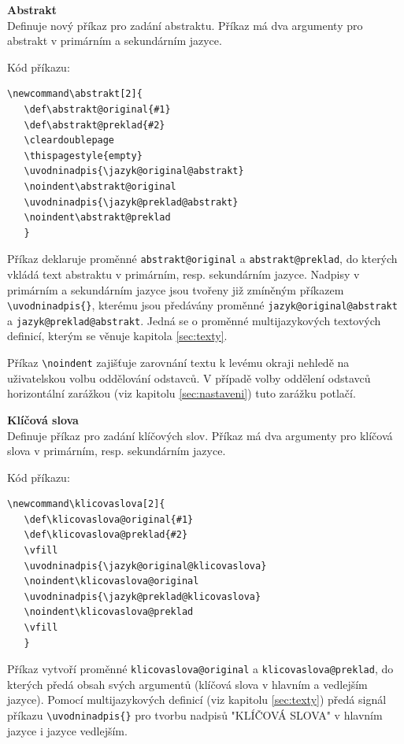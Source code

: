 \vspace{8pt}
\textbf{Abstrakt}\\
Definuje nový příkaz pro zadání abstraktu. Příkaz má dva argumenty pro abstrakt v primárním a sekundárním jazyce.

\newpage
Kód příkazu:

\begin{verbatim}
\newcommand\abstrakt[2]{
   \def\abstrakt@original{#1}
   \def\abstrakt@preklad{#2}
   \cleardoublepage
   \thispagestyle{empty}
   \uvodninadpis{\jazyk@original@abstrakt}
   \noindent\abstrakt@original
   \uvodninadpis{\jazyk@preklad@abstrakt}
   \noindent\abstrakt@preklad
   }
\end{verbatim} 

Příkaz deklaruje proměnné \verb|abstrakt@original| a \verb|abstrakt@preklad|, do kterých vkládá text abstraktu v primárním, resp. sekundárním jazyce. Nadpisy v primárním a sekundárním jazyce jsou tvořeny již zmíněným příkazem \verb|\uvodninadpis{}|, kterému jsou předávány proměnné \verb|jazyk@original@abstrakt| a \verb|jazyk@preklad@abstrakt|. Jedná se o proměnné multijazykových textových definicí, kterým se věnuje kapitola \ref{sec:texty}.

Příkaz \verb|\noindent| zajišťuje zarovnání textu k levému okraji nehledě na uživatelskou volbu oddělování odstavců. V případě volby oddělení odstavců horizontální zarážkou (viz kapitolu \ref{sec:nastaveni}) tuto zarážku potlačí.

\vspace{8pt}
\textbf{Klíčová slova}\\
Definuje příkaz pro zadání klíčových slov. Příkaz má dva argumenty pro klíčová slova v primárním, resp. sekundárním jazyce.

Kód příkazu:

\begin{verbatim}
\newcommand\klicovaslova[2]{
   \def\klicovaslova@original{#1}
   \def\klicovaslova@preklad{#2}
   \vfill
   \uvodninadpis{\jazyk@original@klicovaslova}
   \noindent\klicovaslova@original
   \uvodninadpis{\jazyk@preklad@klicovaslova}
   \noindent\klicovaslova@preklad
   \vfill
   }
\end{verbatim}

Příkaz vytvoří proměnné \verb|klicovaslova@original| a \verb|klicovaslova@preklad|, do kterých předá obsah svých argumentů (klíčová slova v hlavním a vedlejším jazyce). Pomocí multijazykových definicí (viz kapitolu \ref{sec:texty}) předá signál příkazu \verb|\uvodninadpis{}| pro tvorbu nadpisů "KLÍČOVÁ SLOVA" v hlavním jazyce i jazyce vedlejším.

